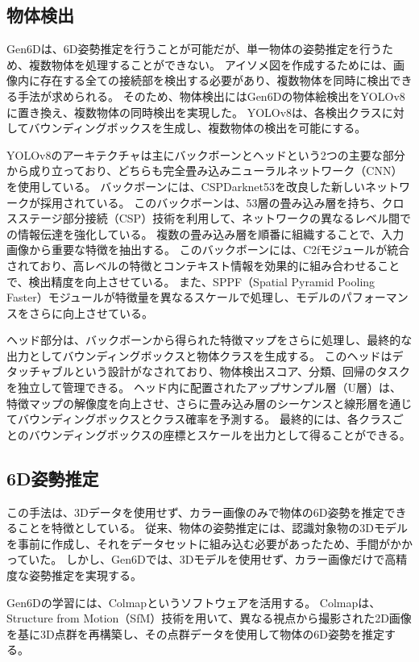 \subsection{物体検出}
Gen6Dは、6D姿勢推定を行うことが可能だが、単一物体の姿勢推定を行うため、複数物体を処理することができない。
アイソメ図を作成するためには、画像内に存在する全ての接続部を検出する必要があり、複数物体を同時に検出できる手法が求められる。
そのため、物体検出にはGen6Dの物体絵検出をYOLOv8に置き換え、複数物体の同時検出を実現した。
YOLOv8は、各検出クラスに対してバウンディングボックスを生成し、複数物体の検出を可能にする。

YOLOv8のアーキテクチャは主にバックボーンとヘッドという2つの主要な部分から成り立っており、どちらも完全畳み込みニューラルネットワーク（CNN）を使用している。
バックボーンには、CSPDarknet53を改良した新しいネットワークが採用されている。
このバックボーンは、53層の畳み込み層を持ち、クロスステージ部分接続（CSP）技術を利用して、ネットワークの異なるレベル間での情報伝達を強化している。
複数の畳み込み層を順番に組織することで、入力画像から重要な特徴を抽出する。
このバックボーンには、C2fモジュールが統合されており、高レベルの特徴とコンテキスト情報を効果的に組み合わせることで、検出精度を向上させている。
また、SPPF（Spatial Pyramid Pooling Faster）モジュールが特徴量を異なるスケールで処理し、モデルのパフォーマンスをさらに向上させている。

ヘッド部分は、バックボーンから得られた特徴マップをさらに処理し、最終的な出力としてバウンディングボックスと物体クラスを生成する。
このヘッドはデタッチャブルという設計がなされており、物体検出スコア、分類、回帰のタスクを独立して管理できる。
ヘッド内に配置されたアップサンプル層（U層）は、特徴マップの解像度を向上させ、さらに畳み込み層のシーケンスと線形層を通じてバウンディングボックスとクラス確率を予測する。
最終的には、各クラスごとのバウンディングボックスの座標とスケールを出力として得ることができる。

\subsection{6D姿勢推定}
この手法は、3Dデータを使用せず、カラー画像のみで物体の6D姿勢を推定できることを特徴としている。
従来、物体の姿勢推定には、認識対象物の3Dモデルを事前に作成し、それをデータセットに組み込む必要があったため、手間がかかっていた。
しかし、Gen6Dでは、3Dモデルを使用せず、カラー画像だけで高精度な姿勢推定を実現する。

Gen6Dの学習には、Colmapというソフトウェアを活用する。
Colmapは、Structure from Motion（SfM）技術を用いて、異なる視点から撮影された2D画像を基に3D点群を再構築し、その点群データを使用して物体の6D姿勢を推定する。

